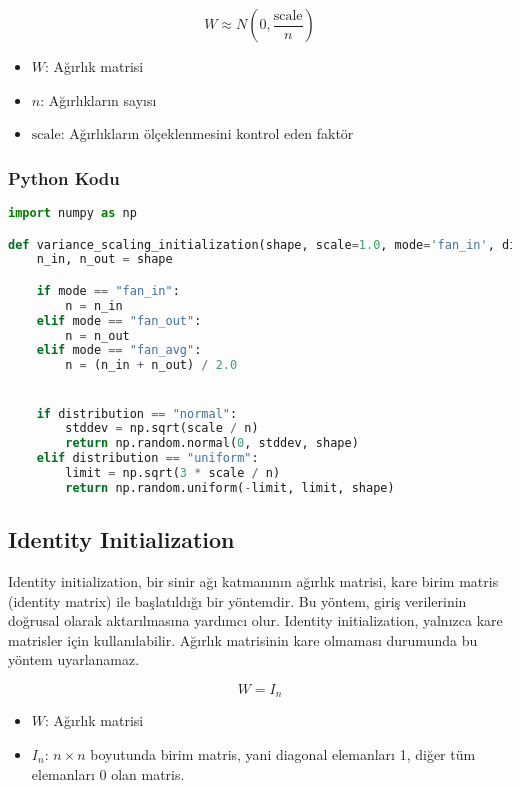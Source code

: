 \[ W \approx N (0, \frac{\text{scale}}{n}) \]

\begin{itemize}
    \item $W$: Ağırlık matrisi
    \item $n$: Ağırlıkların sayısı
    \item $\text{scale}$: Ağırlıkların ölçeklenmesini kontrol eden faktör 
\end{itemize}

\subsubsection{Python Kodu}

\begin{lstlisting}[language=Python]
import numpy as np

def variance_scaling_initialization(shape, scale=1.0, mode='fan_in', distribution='normal'):
    n_in, n_out = shape

    if mode == "fan_in":
        n = n_in
    elif mode == "fan_out":
        n = n_out
    elif mode == "fan_avg":
        n = (n_in + n_out) / 2.0


    if distribution == "normal":
        stddev = np.sqrt(scale / n)
        return np.random.normal(0, stddev, shape)
    elif distribution == "uniform":
        limit = np.sqrt(3 * scale / n)
        return np.random.uniform(-limit, limit, shape)
\end{lstlisting}

\newpage

\subsection{Identity Initialization}

Identity initialization, bir sinir ağı katmanının ağırlık matrisi, kare birim matris (identity matrix) ile başlatıldığı bir yöntemdir. Bu yöntem, giriş verilerinin doğrusal olarak aktarılmasına yardımcı olur. Identity initialization, yalnızca kare matrisler için kullanılabilir. Ağırlık matrisinin kare olmaması durumunda bu yöntem uyarlanamaz.

\[ W = I_n \]

\begin{itemize}
    \item $W$: Ağırlık matrisi
    \item $I_n$: $n \times n$ boyutunda birim matris, yani diagonal elemanları 1, diğer tüm elemanları 0 olan matris.
\end{itemize}

